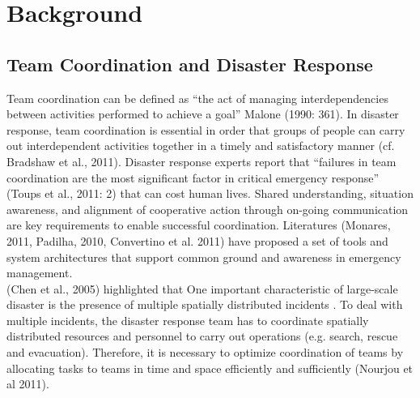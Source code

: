 \section{Background}

\subsection{ Team Coordination and Disaster Response}
Team coordination can be defined as “the act of managing interdependencies between activities performed to achieve a goal” Malone (1990: 361). In disaster response, team coordination is essential in order that groups of people can carry out interdependent activities together in a timely and satisfactory manner (cf. Bradshaw et al., 2011). Disaster response experts report that “failures in team coordination are the most significant factor in critical emergency response” (Toups et al., 2011: 2) that can cost human lives. Shared understanding, situation awareness, and alignment of cooperative action through on-going communication are key requirements to enable successful coordination. Literatures (Monares, 2011, Padilha, 2010, Convertino et al. 2011) have proposed a set of tools and system architectures that support common ground and awareness in emergency management. \\

(Chen et al., 2005) highlighted that One important characteristic of large-scale disaster is the presence of multiple spatially distributed incidents . To deal with multiple incidents, the disaster response team has to coordinate spatially distributed resources and personnel to carry out operations (e.g. search, rescue and evacuation). Therefore, it is necessary to optimize coordination of teams by allocating tasks to teams in time and space efficiently and sufficiently (Nourjou et al 2011). \\

